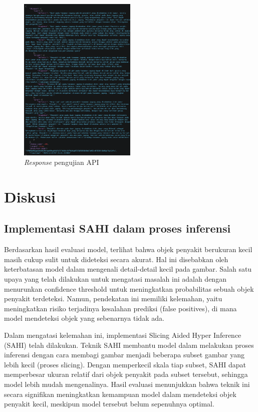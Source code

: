 \documentclass[journal,article,submit,pdftex,moreauthors]{Definitions/mdpi}
\begin{document}
\begin{itemize}
\begin{itemize}[left=0pt, label={}]
\begin{itemize}
        \end{itemize}
    \end{itemize}
    \begin{figure}[H]
        \centering
        \includegraphics[width=0.5\textwidth]{Images/response json.png}
        \caption{\centering \textit{Response} pengujian API}
        \label{fig:apiEndpoint}
    \end{figure}
\end{itemize}
\section{Diskusi}
\subsection{Implementasi SAHI dalam proses inferensi}
Berdasarkan hasil evaluasi model, terlihat bahwa objek penyakit berukuran kecil masih cukup sulit untuk dideteksi secara akurat. Hal ini disebabkan oleh keterbatasan model dalam mengenali detail-detail kecil pada gambar. Salah satu upaya yang telah dilakukan untuk mengatasi masalah ini adalah dengan menurunkan confidence threshold untuk meningkatkan probabilitas sebuah objek penyakit terdeteksi. Namun, pendekatan ini memiliki kelemahan, yaitu meningkatkan risiko terjadinya kesalahan prediksi (false positives), di mana model mendeteksi objek yang sebenarnya tidak ada.

Dalam mengatasi kelemahan ini, implementasi Slicing Aided Hyper Inference (SAHI) telah dilakukan. Teknik SAHI membantu model dalam melakukan proses inferensi dengan cara membagi gambar menjadi beberapa subset gambar yang lebih kecil (proses slicing). Dengan memperkecil skala tiap subset, SAHI dapat memperbesar ukuran relatif dari objek penyakit pada subset tersebut, sehingga model lebih mudah mengenalinya. Hasil evaluasi menunjukkan bahwa teknik ini secara signifikan meningkatkan kemampuan model dalam mendeteksi objek penyakit kecil, meskipun model tersebut belum sepenuhnya optimal.
\end{document}
